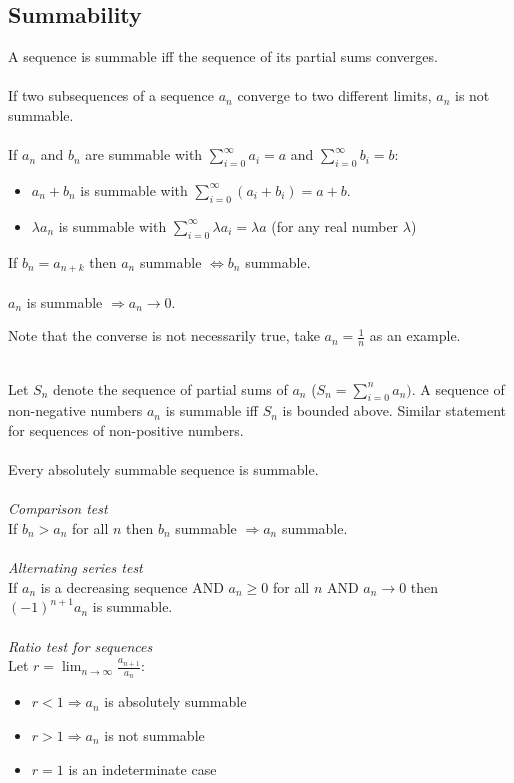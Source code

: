 \documentclass{scrartcl}
\begin{document}
\subsection{Summability}
A sequence is summable iff the sequence of its partial sums converges.
\\\\
If two subsequences of a sequence $ a_{n} $ converge to two different limits, $ a_{n} $ is not summable.
\\\\
If $ a_{n} $ and $ b_{n} $ are summable with $ \sum_{i = 0}^{\infty} a_{i} = a $ and $ \sum_{i = 0}^{\infty} b_{i} = b $:
\begin{itemize}
\item $ a_{n} + b_{n} $ is summable with $ \sum_{i = 0}^{\infty} (a_{i} + b_{i}) = a + b $.
\item $ \lambda a_{n} $ is summable with $ \sum_{i = 0}^{\infty} \lambda a_{i} = \lambda a $ (for any real number $ \lambda $)
\end{itemize}
If $ b_{n} = a_{n + k} $ then $ a_{n} $ summable $ \Leftrightarrow b_{n} $ summable.
\\\\
$ a_{n} $ is summable $ \Rightarrow a_{n} \to 0 $.
\\
\begin{tcolorbox}[breakable]
Note that the converse is not necessarily true, take $ a_{n} = \frac{1}{n} $ as an example.
\end{tcolorbox}
\noindent
\\
Let $ S_{n} $ denote the sequence of partial sums of $ a_{n} $ ($ S_{n} = \sum_{i = 0}^{n} a_{n}) $. A sequence of non-negative numbers $ a_{n} $ is summable iff $ S_{n} $ is bounded above. Similar statement for sequences of non-positive numbers.
\\\\
Every absolutely summable sequence is summable.
\\\\
\textit{Comparison test}
\\
If $ b_{n} > a_{n} $ for all $ n $ then $ b_{n} $ summable $ \Rightarrow a_{n} $ summable.
\\\\
\textit{Alternating series test}
\\
If $ a_{n} $ is a decreasing sequence AND $ a_{n} \geq 0 $ for all $ n $ AND $ a_{n} \to 0 $ then $ (-1)^{n+1} a_{n} $ is summable.
\\\\
\textit{Ratio test for sequences}
\\
Let $ r = \lim_{n \to \infty} \frac{a_{n + 1}}{a_{n}} $:
\begin{itemize}
\item $ r < 1 \Rightarrow a_{n} $ is absolutely summable
\item $ r > 1 \Rightarrow a_{n} $ is not summable
\item $ r = 1 $ is an indeterminate case
\end{itemize}
\end{document}
